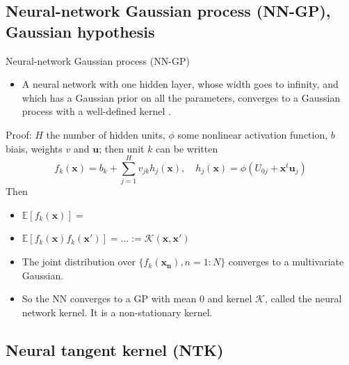 \documentclass[9pt]{beamer}
\begin{document}
\subsection{Neural-network Gaussian process (NN-GP), Gaussian hypothesis}

\begin{frame}{Neural-network Gaussian process (NN-GP)}
	\begin{itemize}
		\item 	A neural network with one hidden layer, whose width goes to infinity, and which has a Gaussian prior on all the parameters, converges to a Gaussian process with a well-defined kernel \citep{neal1996bayesian}.
	\end{itemize}
	\alert{Proof}: $H$ the number of hidden units, $\phi$ some nonlinear activation function, $b$ biais, weights $v$ and $\boldsymbol{u}$; then unit $k$ can be written
		$$f_k(\boldsymbol{x}) = b_k+\sum_{j=1}^H v_{jk}h_j(\boldsymbol{x}), \quad h_j(\boldsymbol{x}) = \phi(U_{0j}+\boldsymbol{x}^t \boldsymbol{u}_j)$$
		Then
		\begin{itemize}
			\item $\mathbb{E}[f_k(\boldsymbol{x})]=$
			\item $\mathbb{E}[f_k(\boldsymbol{x})f_k(\boldsymbol{x}')]=\ldots := \mathcal{K}(\boldsymbol{x},\boldsymbol{x}')$
			\item The joint distribution over $\{f_k(\boldsymbol{x_n}), n=1:N\}$ converges to a multivariate Gaussian.
			\item So the NN converges to a GP with mean 0 and kernel $\mathcal{K}$, called the \alert{neural network kernel}. It is a non-stationary kernel.
		\end{itemize}
\end{frame}


\subsection{Neural tangent kernel (NTK)}
\end{document}
